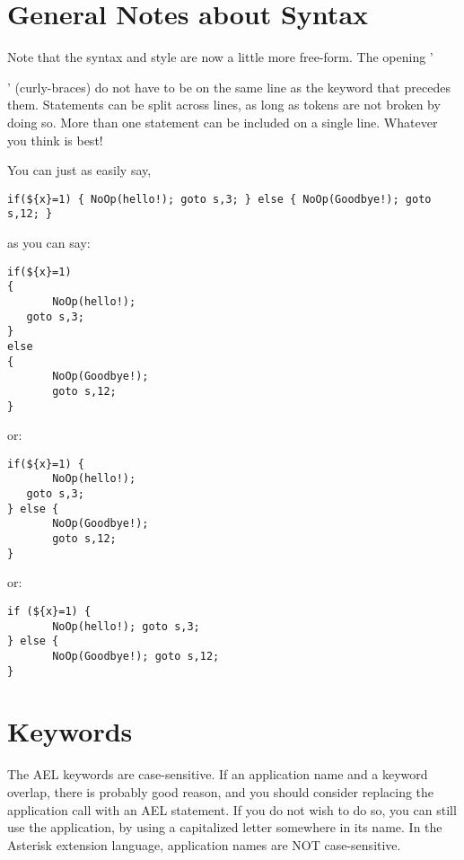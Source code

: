 \section{General Notes about Syntax}

Note that the syntax and style are now a little more free-form. The
opening '{' (curly-braces) do not have to be on the same line as the
keyword that precedes them. Statements can be split across lines, as
long as tokens are not broken by doing so. More than one statement can
be included on a single line. Whatever you think is best!

You can just as easily say,

\begin{astlisting}
\begin{verbatim}
if(${x}=1) { NoOp(hello!); goto s,3; } else { NoOp(Goodbye!); goto s,12; }
\end{verbatim}
\end{astlisting}
as you can say:
\begin{astlisting}
\begin{verbatim}
if(${x}=1)
{
       NoOp(hello!);
   goto s,3;
}
else
{
       NoOp(Goodbye!);
       goto s,12;
}
\end{verbatim}
\end{astlisting}

or:

\begin{astlisting}
\begin{verbatim}
if(${x}=1) {
       NoOp(hello!);
   goto s,3;
} else {
       NoOp(Goodbye!);
       goto s,12;
}
\end{verbatim}
\end{astlisting}

or:

\begin{astlisting}
\begin{verbatim}
if (${x}=1) {
       NoOp(hello!); goto s,3;
} else {
       NoOp(Goodbye!); goto s,12;
}
\end{verbatim}
\end{astlisting}

\section{Keywords}

The AEL keywords are case-sensitive. If an application name and a
keyword overlap, there is probably good reason, and you should
consider replacing the application call with an AEL statement. If you
do not wish to do so, you can still use the application, by using a
capitalized letter somewhere in its name. In the Asterisk extension
language, application names are NOT case-sensitive.

}
